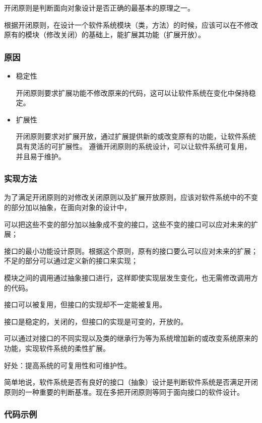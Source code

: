 开闭原则是判断面向对象设计是否正确的最基本的原理之一。

根据开闭原则，在设计一个软件系统模块（类，方法）的时候，应该可以在不修改原有的模块（修改关闭）的基础上，能扩展其功能（扩展开放）。

\subsubsection{原因}

\begin{itemize}
\item{稳定性}

开闭原则要求扩展功能不修改原来的代码，这可以让软件系统在变化中保持稳定。

\item{扩展性}

开闭原则要求对扩展开放，通过扩展提供新的或改变原有的功能，让软件系统具有灵活的可扩展性。
遵循开闭原则的系统设计，可以让软件系统可复用，并且易于维护。
\end{itemize}

\subsubsection{实现方法}

为了满足开闭原则的对修改关闭原则以及扩展开放原则，应该对软件系统中的不变的部分加以抽象，在面向对象的设计中，

可以把这些不变的部分加以抽象成不变的接口，这些不变的接口可以应对未来的扩展；

接口的最小功能设计原则。根据这个原则，原有的接口要么可以应对未来的扩展；不足的部分可以通过定义新的接口来实现；

模块之间的调用通过抽象接口进行，这样即使实现层发生变化，也无需修改调用方的代码。

接口可以被复用，但接口的实现却不一定能被复用。

接口是稳定的，关闭的，但接口的实现是可变的，开放的。

可以通过对接口的不同实现以及类的继承行为等为系统增加新的或改变系统原来的功能，实现软件系统的柔性扩展。

好处：提高系统的可复用性和可维护性。

简单地说，软件系统是否有良好的接口（抽象）设计是判断软件系统是否满足开闭原则的一种重要的判断基准。现在多把开闭原则等同于面向接口的软件设计。

\subsubsection{代码示例}


